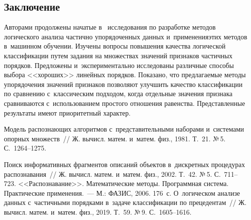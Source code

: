 \begin{multicols}{2}
\section{Заключение}
  
  Авторами продолжены начатые в~\cite{2-duk, 6-duk, 7-duk} исследования по 
разработке методов логического анализа частично упорядоченных данных 
и~применения\linebreak этих методов в~машинном обучении. Изучены \mbox{вопросы} 
повышения качества логической классификации путем задания на множествах 
значений признаков частичных порядков. Предложены и~экспериментально 
исследованы различные способы выбора <<хороших>> линейных порядков. 
Показано, что предлагаемые методы упорядочения значений признаков 
позволяют улучшить качество классификации по сравнению с~классическим 
подходом, когда отдельные значения признака сравниваются с~использованием 
простого отношения равенства. Представленные результаты имеют 
приоритетный характер.

 \vspace*{-3pt}
  
{\small\frenchspacing
 {%
 \begin{thebibliography}{9}
   Модель рас\-по\-зна\-ющих алгоритмов 
с~пред\-ста\-ви\-тель\-ны\-ми наборами и~сис\-те\-ма\-ми опорных множеств~// Ж. вычисл. матем. 
и~матем. физ., 1981. Т.~21. №\,5. С.~1264--1275.

 Поиск информативных фрагментов описаний объектов 
в~дискретных процедурах распознавания~// Ж. вычисл. матем. и~матем. физ., 2002. Т.~42. 
№\,5. С.~711--723.
    <<Распознавание>>. Математические 
методы. Программная сис\-те\-ма. Практические применения.~--- М.: ФАЗИС, 2006. 176~с.
    О~логическом анализе данных 
с~частичными порядками в~задаче классификации по прецедентам~// Ж. вычисл. матем. 
и~матем. физ., 2019. Т.~59. №\,9. С.~1605--1616.
 

\end{thebibliography}}}
\end{multicols}
